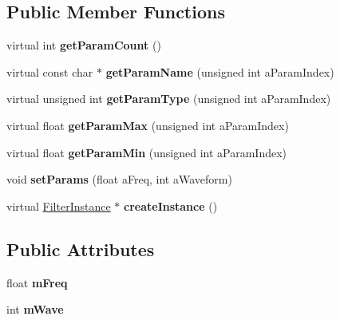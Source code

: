 \subsection*{Public Member Functions}
\begin{DoxyCompactItemize}
\item 
\mbox{\label{class_so_loud_1_1_robotize_filter_a23c362c64db80c23e703571f2f1defd0}} 
virtual int {\bfseries get\+Param\+Count} ()
\item 
\mbox{\label{class_so_loud_1_1_robotize_filter_ad9d372536c2212a0a6c40c12ac9918b7}} 
virtual const char $\ast$ {\bfseries get\+Param\+Name} (unsigned int a\+Param\+Index)
\item 
\mbox{\label{class_so_loud_1_1_robotize_filter_ab6c3f55e483a0126be81c69cec807acc}} 
virtual unsigned int {\bfseries get\+Param\+Type} (unsigned int a\+Param\+Index)
\item 
\mbox{\label{class_so_loud_1_1_robotize_filter_a240752be05430dab8c83708253da3158}} 
virtual float {\bfseries get\+Param\+Max} (unsigned int a\+Param\+Index)
\item 
\mbox{\label{class_so_loud_1_1_robotize_filter_abdcabeb4353ba05235416c67e7bc44ef}} 
virtual float {\bfseries get\+Param\+Min} (unsigned int a\+Param\+Index)
\item 
\mbox{\label{class_so_loud_1_1_robotize_filter_a728ff6864464870a09b5938bcc1edcfa}} 
void {\bfseries set\+Params} (float a\+Freq, int a\+Waveform)
\item 
\mbox{\label{class_so_loud_1_1_robotize_filter_a6a5566278b6b5dca810afbd0a809fa14}} 
virtual \mbox{\hyperlink{class_so_loud_1_1_filter_instance}{Filter\+Instance}} $\ast$ {\bfseries create\+Instance} ()
\end{DoxyCompactItemize}
\subsection*{Public Attributes}
\begin{DoxyCompactItemize}
\item 
\mbox{\label{class_so_loud_1_1_robotize_filter_a851e764549e01a506c5014a82078ecf6}} 
float {\bfseries m\+Freq}
\item 
\mbox{\label{class_so_loud_1_1_robotize_filter_a50d2cca02daa0207ec5c5b5926d56a9d}} 
int {\bfseries m\+Wave}
\end{DoxyCompactItemize}



